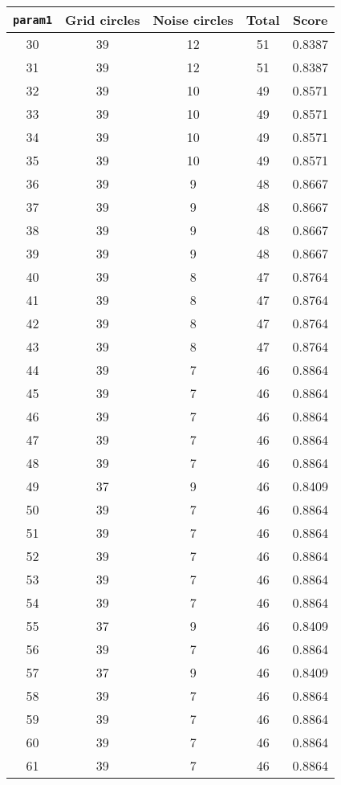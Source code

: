 \documentclass[letterpaper, 12pt]{article}
\begin{document}
\begin{longtable}{|c|c|c|c|c|}
\hline
\textbf{\texttt{param1}} & \textbf{Grid circles} & \textbf{Noise circles} & \textbf{Total} & \textbf{Score} \\
\hline
30 & 39 & 12 & 51 & 0.8387 \\
\hline
31 & 39 & 12 & 51 & 0.8387 \\
\hline
32 & 39 & 10 & 49 & 0.8571 \\
\hline
33 & 39 & 10 & 49 & 0.8571 \\
\hline
34 & 39 & 10 & 49 & 0.8571 \\
\hline
35 & 39 & 10 & 49 & 0.8571 \\
\hline
36 & 39 & 9 & 48 & 0.8667 \\
\hline
37 & 39 & 9 & 48 & 0.8667 \\
\hline
38 & 39 & 9 & 48 & 0.8667 \\
\hline
39 & 39 & 9 & 48 & 0.8667 \\
\hline
40 & 39 & 8 & 47 & 0.8764 \\
\hline
41 & 39 & 8 & 47 & 0.8764 \\
\hline
42 & 39 & 8 & 47 & 0.8764 \\
\hline
43 & 39 & 8 & 47 & 0.8764 \\
\hline
44 & 39 & 7 & 46 & 0.8864 \\
\hline
45 & 39 & 7 & 46 & 0.8864 \\
\hline
46 & 39 & 7 & 46 & 0.8864 \\
\hline
47 & 39 & 7 & 46 & 0.8864 \\
\hline
48 & 39 & 7 & 46 & 0.8864 \\
\hline
49 & 37 & 9 & 46 & 0.8409 \\
\hline
50 & 39 & 7 & 46 & 0.8864 \\
\hline
51 & 39 & 7 & 46 & 0.8864 \\
\hline
52 & 39 & 7 & 46 & 0.8864 \\
\hline
53 & 39 & 7 & 46 & 0.8864 \\
\hline
54 & 39 & 7 & 46 & 0.8864 \\
\hline
55 & 37 & 9 & 46 & 0.8409 \\
\hline
56 & 39 & 7 & 46 & 0.8864 \\
\hline
57 & 37 & 9 & 46 & 0.8409 \\
\hline
58 & 39 & 7 & 46 & 0.8864 \\
\hline
59 & 39 & 7 & 46 & 0.8864 \\
\hline
60 & 39 & 7 & 46 & 0.8864 \\
\hline
61 & 39 & 7 & 46 & 0.8864 \\

\end{longtable}
\end{document}
